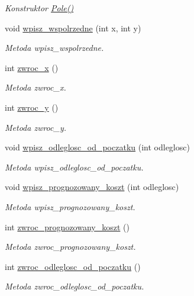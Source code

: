 \begin{DoxyCompactItemize}
\begin{DoxyCompactList}\small\item\em Konstruktor \hyperlink{class_pole_ae07d230d40c34e5bc67e2016b3aa9db1}{Pole()} \end{DoxyCompactList}\item 
void \hyperlink{class_pole_a18f5b7b9d3c3cdfc2e2194fc6f22627d}{wpisz\+\_\+wspolrzedne} (int x, int y)
\begin{DoxyCompactList}\small\item\em Metoda wpisz\+\_\+wspolrzedne. \end{DoxyCompactList}\item 
int \hyperlink{class_pole_a5160e550f41891b239de1242daa076a7}{zwroc\+\_\+x} ()
\begin{DoxyCompactList}\small\item\em Metoda zwroc\+\_\+x. \end{DoxyCompactList}\item 
int \hyperlink{class_pole_a3c965c7a9e898dadb87b706774fc7f98}{zwroc\+\_\+y} ()
\begin{DoxyCompactList}\small\item\em Metoda zwroc\+\_\+y. \end{DoxyCompactList}\item 
void \hyperlink{class_pole_ad5a4e65a147a20e4f6f6cac7f521d03c}{wpisz\+\_\+odleglosc\+\_\+od\+\_\+poczatku} (int odleglosc)
\begin{DoxyCompactList}\small\item\em Metoda wpisz\+\_\+odleglosc\+\_\+od\+\_\+poczatku. \end{DoxyCompactList}\item 
void \hyperlink{class_pole_aa8fd12a850921735faabca2df0dac7df}{wpisz\+\_\+prognozowany\+\_\+koszt} (int odleglosc)
\begin{DoxyCompactList}\small\item\em Metoda wpisz\+\_\+prognozowany\+\_\+koszt. \end{DoxyCompactList}\item 
int \hyperlink{class_pole_a23d0d69e0e49711d170c4a5ce48acf5e}{zwroc\+\_\+prognozowany\+\_\+koszt} ()
\begin{DoxyCompactList}\small\item\em Metoda zwroc\+\_\+prognozowany\+\_\+koszt. \end{DoxyCompactList}\item 
int \hyperlink{class_pole_a2ad6e8e63a7a672be25b7781fecef8ad}{zwroc\+\_\+odleglosc\+\_\+od\+\_\+poczatku} ()
\begin{DoxyCompactList}\small\item\em Metoda zwroc\+\_\+odleglosc\+\_\+od\+\_\+poczatku. \end{DoxyCompactList}\item 

\end{DoxyCompactItemize}
